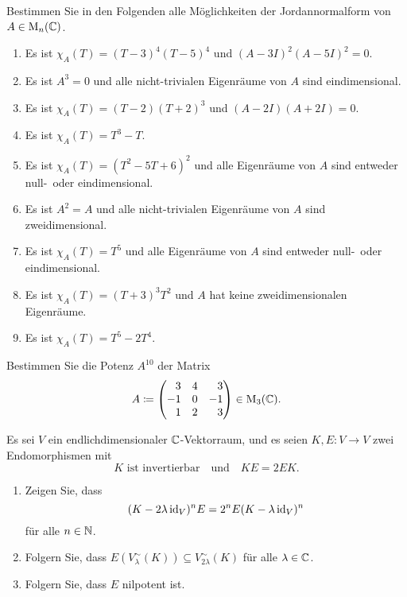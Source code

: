 \begin{question}[subtitle = Bestimmung möglicher Jordannormalformen]{2}
  Bestimmen Sie in den Folgenden alle Möglichkeiten der Jordannormalform von $A \in \operatorname{M}_n(\mathbb{C})$.
  \begin{enumerate}[leftmargin=*]
    \item
     Es ist $\chi_A(T) = (T-3)^4 (T-5)^4$ und $(A - 3I)^2 (A - 5I)^2 = 0$.
    \item
      Es ist $A^3 = 0$ und alle nicht-trivialen Eigenräume von $A$ sind eindimensional.
    \item
      Es ist $\chi_A(T) = (T-2)(T+2)^3$ und $(A - 2I)(A + 2I) = 0$.
    \item
      Es ist $\chi_A(T) = T^3 - T$.
    \item
      Es ist $\chi_A(T) = (T^2 -5T + 6)^2$ und alle Eigenräume von $A$ sind entweder null-\ oder eindimensional.
    \item
      Es ist $A^2 = A$ und alle nicht-trivialen Eigenräume von $A$ sind zweidimensional.
    \item
      Es ist $\chi_A(T) = T^5$ und alle Eigenräume von $A$ sind entweder null-\ oder eindimensional.
    \item
      Es ist $\chi_A(T) = (T+3)^3 T^2$ und $A$ hat keine zweidimensionalen Eigenräume.
    \item
      Es ist $\chi_A(T) = T^5 - 2 T^4$.
  \end{enumerate}
\end{question}


\begin{question}{2}
  Bestimmen Sie die Potenz $A^{10}$ der Matrix
  \[
    A
    \coloneqq
    \begin{pmatrix*}[r]
       3  & 4 &  3      \\
      -1  & 0 & -1      \\
       1  & 2 &  3
    \end{pmatrix*}
    \in \Mat_3(\Cbb).
  \]
\end{question}







\begin{question}[subtitle = Shiften von Haupträumen]{3}
  Es sei $V$ ein endlichdimensionaler $\mathbb{C}$-Vektorraum, und es seien $K, E \colon V \to V$ zwei Endomorphismen mit
  \[
    \text{$K$ ist invertierbar}
    \quad\text{und}\quad
    KE = 2EK.
  \]
  \begin{enumerate}[leftmargin=*]
    \item
      Zeigen Sie, dass
      \[
        (K - 2 \lambda \operatorname{id}_V)^n E = 2^n E (K - \lambda \operatorname{id}_V)^n
      \]
      für alle $n \in \mathbb{N}$.
    \item
      Folgern Sie, dass $E( V^\sim_\lambda(K) ) \subseteq V^\sim_{2\lambda}(K)$ für alle $\lambda \in \mathbb{C}$.
    \item
      Folgern Sie, dass $E$ nilpotent ist.
  \end{enumerate}
\end{question}


